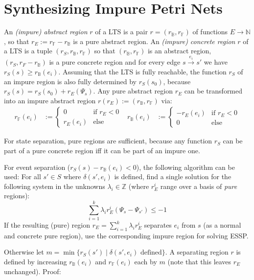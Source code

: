 \documentclass{scrartcl}
\newcommand{\N}{\mathbb{N}}
\newcommand{\Z}{\mathbb{Z}}
\newcommand{\B}{\mathbb{B}}
\newcommand{\F}{\mathbb{F}}
\newcommand{\1}{\textbf{1}}
\begin{document}
\section{Synthesizing Impure Petri Nets}
An \emph{(impure) abstract region} \(r\) of a LTS is a pair \(r=(r_\B, r_\F)\) of functions \(E\rightarrow\N\), so that
\(r_E:=r_\F-r_\B\) is a pure abstract region.
An \emph{(impure) concrete region} \(r\) of a LTS is a tuple \((r_S, r_\B, r_\F)\) so that \((r_\B, r_\F)\) is an abstract
region, \((r_S, r_F-r_\B)\) is a pure concrete region and for every edge \(s\xrightarrow{e_i}s'\) we have \(r_S(s)\geq
r_\B(e_i)\).
Assuming that the LTS is fully reachable, the function \(r_S\) of an impure region is also fully determined by
\(r_S(s_0)\), because \(r_S(s)=r_S(s_0)+r_E(\Psi_s)\).
Any pure abstract region \(r_E\) can be transformed into an impure abstract region \(r(r_E):=(r_\B, r_\F)\) via:
\begin{align*}
r_\F(e_i) &:= \begin{cases}
	0 & \text{if \(r_E<0\)} \\
	r_E(e_i) & \text{else}
\end{cases} &
r_\B(e_i) &:= \begin{cases}
	-r_E(e_i) & \text{if \(r_E<0\)} \\
	0 & \text{else}
\end{cases}
\end{align*}

For state separation, pure regions are sufficient, because any function \(r_S\) can be part of a pure concrete region iff it can
be part of an impure one.

For event separation (\(r_S(s)-r_\B(e_i)<0\)), the following algorithm can be used:
For all \(s'\in S\) where \(\delta(s',e_i)\) is defined, find a single solution for the following system in the unknowns
\(\lambda_i\in\Z\) (where \(r_E^i\) range over
a basis of \emph{pure} regions):
\[
\sum_{i=1}^k \lambda_i r_E^i(\Psi_s-\Psi_{s'}) \leq -1
\]
If the resulting (pure) region \(r_E=\sum_{i=1}^k\lambda_ir_E^i\) separates \(e_i\) from \(s\) (as a normal and concrete
pure region), use the corresponding impure region for solving ESSP.

Otherwise let \(m=\min\lbrace r_S(s')\mid \delta(s',e_i) \text{ defined}\rbrace\).
A separating region \(r\) is defined by increasing \(r_\B(e_i)\) and \(r_\F(e_i)\) each by \(m\) (note that this leaves
\(r_E\) unchanged). Proof:
\end{document}
